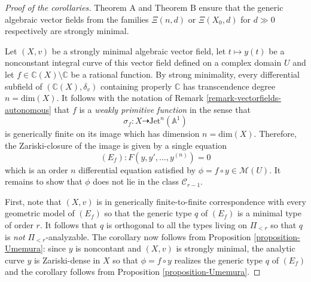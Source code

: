\documentclass[12pt]{amsart}
\theoremstyle{definition}
\theoremstyle{plain}
\theoremstyle{exampstyle}
\theoremstyle{exampstyle}\newtheorem{thmxbis}{Theorem}
\numberwithin{equation}{section}
\theoremstyle{remark}
\begin{document}
\begin{proof}[Proof of the corollaries] 
Theorem A and Theorem B ensure that the generic algebraic vector fields  from the families $\Xi(n,d)$ or $\Xi(X_0,d)$ for $d \gg 0$ respectively are strongly minimal. 

Let $(X,v)$ be a strongly minimal algebraic vector field, let $t \mapsto y(t)$ be a nonconstant integral curve of this vector field defined on a complex domain $U$ and let $f \in \mathbb{C}(X) \setminus \mathbb{C}$ be a rational function.  By strong minimality, every differential subfield of $(\mathbb{C}(X),\delta_v)$ containing properly $\mathbb{C}$ has transcendence degree $ n= \mathrm{dim}(X)$. It follows with the notation of Remark \ref{remark-vectorfields-autonomous} that $f$ is a {\em weakly primitive function} in the sense that 
$$\sigma_f : X \dashrightarrow \mathrm{Jet}^n(\mathbb{A}^1)$$ is generically finite on its image which has dimension $ n = \mathrm{dim}(X)$. Therefore, the Zariski-closure of the image is given by a single equation 
$$(E_f) : F(y,y',\ldots, y^{(n)}) = 0$$
which is an order $n$ differential equation satisfied by $\phi = f \circ y \in \mathcal M(U)$. It remains to show that $\phi$ does not lie in the class $\mathcal C_{r - 1}$. 

First, note that $(X,v)$ is in generically finite-to-finite correspondence with every geometric model of $(E_f)$ so that the generic type $q$ of $(E_f)$ is a minimal type of order $r$. It follows that $q$ is orthogonal to all the types living on $\Pi_{<r}$ so that $q$ is {\em not} $\Pi_{<r}$-analyzable. The corollary now follows from Proposition \ref{proposition-Umemura}: 
since $y$ is noncontant and $(X,v)$ is strongly minimal, the analytic curve $y$ is Zariski-dense in $X$ so that $\phi = f \circ y$ realizes the generic type $q$ of $(E_f)$ and the corollary follows from Proposition \ref{proposition-Umemura}.  
\end{proof} 
\end{document}

